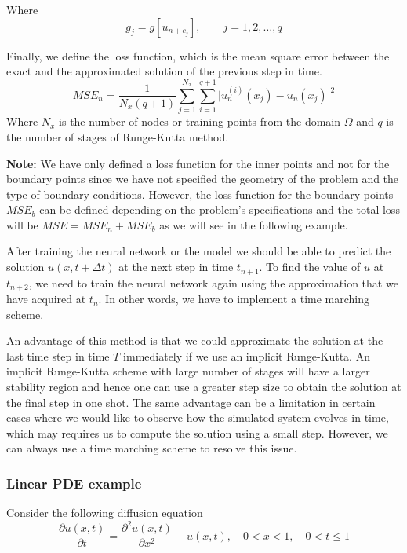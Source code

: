 \documentclass[a4paper, onecolumn, 12pt]{article}
\begin{document}
Where 
$$g_j = g[u_{n+c_j}], \qquad  j = 1, 2, \dots, q$$

Finally, we define the loss function, which is the mean square error between the exact and the approximated 
solution of the previous step in time.
\begin{equation}
MSE_{n} = \frac{1}{N_x (q+1)} \sum_{j=1}^{N_x} \sum_{i=1}^{q+1} \Big| u_n^{(i)}(x_j) - u_n(x_j) \Big|^2
\end{equation}
Where $N_x$ is the number of nodes or training points from the domain $\Omega$ and $q$ is the number 
of stages of Runge-Kutta method.

\textbf{Note:} We have only defined a loss function for the inner points and not for the boundary
points since we have not specified the geometry of the problem and the type of boundary conditions.
However, the loss function for the boundary points $MSE_b$ can be defined depending on 
the problem's specifications and the total loss will be $MSE = MSE_n + MSE_b$ as we will see in the following 
example.  

After training the neural network or the model we should be able to predict the solution $u(x, t + \Delta t)$
at the next step in time $t_{n+1}$. To find the value of $u$ at $t_{n+2}$, we need to train the neural network
again using the approximation that we have acquired at $t_{n}$. In other words, we have to implement a time marching 
scheme. 

An advantage of this method is that we could approximate the solution at the last time step in time $T$ immediately
if we use an implicit Runge-Kutta. An implicit Runge-Kutta scheme with large number of stages will have a larger 
stability region and hence one can use a greater step size to obtain the solution at the final step in one shot. 
The same advantage can be a limitation in certain cases where we would like to observe how the simulated system 
evolves in time, which may requires us to compute the solution using a small step.
However, we can always use a time marching scheme to resolve this issue.

\subsubsection{Linear PDE example}
Consider the following diffusion equation 
\begin{equation}\label{diffusion_discrete_time}
\frac{\partial u(x,t)}{\partial t} = \frac{\partial^2 u(x,t)}{\partial x^2} - u(x, t),
\quad 0 < x < 1, \quad 0 < t  \le 1
\end{equation}
\end{document}
